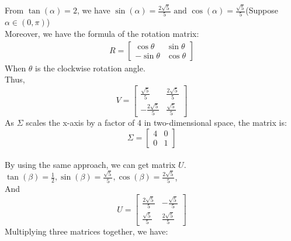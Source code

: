 \documentclass{article}
\begin{document}
\subsection{} %
From $ \tan(\alpha  ) = 2 $, we have $ \sin(\alpha ) = \frac{2\sqrt{5}}{5} \text { and  } \cos(\alpha  ) = \frac{\sqrt5}{5} $(Suppose $ \alpha \in (0, \pi) $)\\
Moreover, we have the formula of the rotation matrix:
\begin{align*}
    R = \begin{bmatrix}
    \cos\theta  & \sin\theta  \\
    -\sin\theta  & \cos\theta
    \end{bmatrix}
\end{align*} 
When $ \theta $ is the clockwise rotation angle. \\
Thus, $$ V = \begin{bmatrix}
\frac{\sqrt5 }{5} & \frac{2\sqrt{5}}{5} \\
-\frac{2\sqrt{5}}{5} & \frac{\sqrt 5 }{5}
\end{bmatrix} $$
As $ \Sigma  $ scales the x-axis by a factor of 4 in two-dimensional space, the matrix is: $$ \Sigma = \begin{bmatrix}
4 & 0 \\
0 & 1
\end{bmatrix} $$ \\
By using the same approach, we can get matrix $ U $. $ \tan(\beta) = \frac{1}{2}, \sin(\beta) = \frac{\sqrt{5}}{5}, \cos(\beta) = \frac{2 \sqrt{5}}{5} $,\\
And $$ U = \begin{bmatrix}
\frac{2 \sqrt{5}}{5} & -\frac{\sqrt{5}}{5} \\
\frac{\sqrt{5}}{5} & \frac{2 \sqrt{5}}{5}
\end{bmatrix} $$
Multiplying three matrices together, we have:
\end{document}
